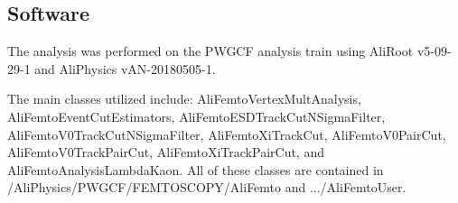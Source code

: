 \documentclass[../AnalysisNoteJBuxton.tex]{subfiles}
\begin{document}
\subsection{Software}
\label{sec:Software}

The analysis was performed on the PWGCF analysis train using AliRoot v5-09-29-1 and AliPhysics vAN-20180505-1.

The main classes utilized include: AliFemtoVertexMultAnalysis, AliFemtoEventCutEstimators, AliFemtoESDTrackCutNSigmaFilter, AliFemtoV0TrackCutNSigmaFilter, AliFemtoXiTrackCut, AliFemtoV0PairCut, AliFemtoV0TrackPairCut, AliFemtoXiTrackPairCut, and AliFemtoAnalysisLambdaKaon.
All of these classes are contained in /AliPhysics/PWGCF/FEMTOSCOPY/AliFemto and .../AliFemtoUser.
\end{document}
